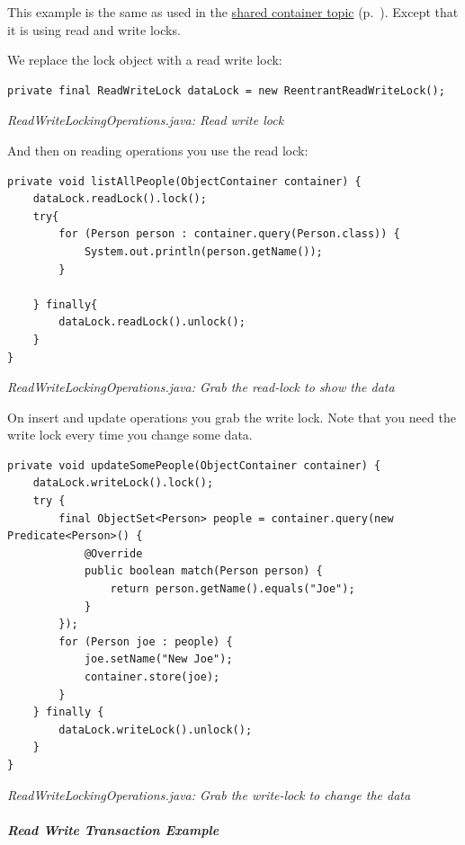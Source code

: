 This example is the same as used in the \hyperref[ref:advanced-topics-concurrency-share-object-container-threads]{shared container topic} (p.~\pageref{ref:advanced-topics-concurrency-share-object-container-threads}). Except that it is using read and write locks.

We replace the lock object with a read write lock:

\begin{lstlisting}
private final ReadWriteLock dataLock = new ReentrantReadWriteLock();
\end{lstlisting}

{\small\itshape ReadWriteLockingOperations.java: Read write lock\par}
\medskip

And then on reading operations you use the read lock:

\begin{lstlisting}
private void listAllPeople(ObjectContainer container) {
    dataLock.readLock().lock();
    try{
        for (Person person : container.query(Person.class)) {
            System.out.println(person.getName());
        }

    } finally{
        dataLock.readLock().unlock();
    }
}
\end{lstlisting}

{\small\itshape ReadWriteLockingOperations.java: Grab the read-lock to show the data\par}
\medskip

On insert and update operations you grab the write lock. Note that you need the write lock every time you change some data.

\begin{lstlisting}
private void updateSomePeople(ObjectContainer container) {
    dataLock.writeLock().lock();
    try {
        final ObjectSet<Person> people = container.query(new Predicate<Person>() {
            @Override
            public boolean match(Person person) {
                return person.getName().equals("Joe");
            }
        });
        for (Person joe : people) {
            joe.setName("New Joe");
            container.store(joe);
        }
    } finally {
        dataLock.writeLock().unlock();
    }
}
\end{lstlisting}

{\small\itshape ReadWriteLockingOperations.java: Grab the write-lock to change the data\par}
\medskip

\subparagraph{Read Write Transaction Example}
\label{ref:advanced-topics-concurrency-read-write-lock-example:read}

